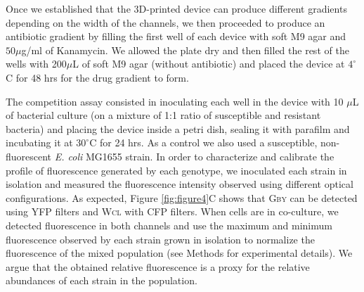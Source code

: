 \documentclass[fleqn,12pt]{wlscirep}
\begin{document}
Once we established that the 3D-printed device can produce different gradients depending on the width of the channels, we then proceeded to produce an antibiotic gradient by filling the first well of each device with soft M9 agar and $50 \mu$g/ml of Kanamycin. We allowed the plate dry and then filled the rest of the wells with 200$\mu$L of soft M9 agar (without antibiotic) and placed the device at $4^{\circ}$C for 48 hrs for the drug gradient to form. 

The competition assay consisted in inoculating each well in the device with 10 $\mu$L of bacterial culture (on a mixture of 1:1 ratio of susceptible and resistant bacteria) and placing the device inside a petri dish, sealing it with parafilm and incubating it at $30^\circ$C for 24 hrs. As a control we also used a susceptible, non-fluorescent {\em E. coli} MG1655 strain.  In order to characterize and calibrate the profile of fluorescence generated by each genotype, we inoculated each strain in isolation and measured the fluorescence intensity observed using different optical configurations.  As expected, Figure \ref{fig:figure4}C shows that \textsc{Gby} can be detected using YFP filters and \textsc{Wcl} with CFP filters.  When cells are in co-culture, we detected fluorescence in both channels and use the maximum and minimum fluorescence observed by each strain grown in isolation to normalize the fluorescence of the mixed population (see Methods for experimental details).  We argue that the obtained relative fluorescence is a proxy for the relative abundances of each strain in the population.  
\end{document}
